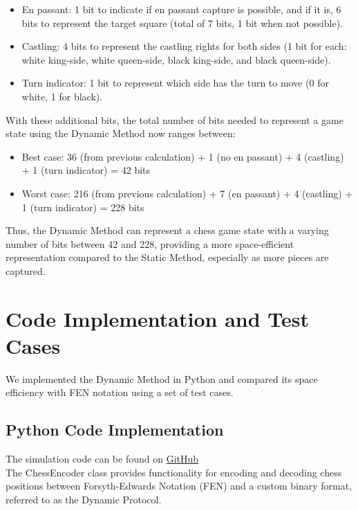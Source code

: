 \documentclass{article}
\begin{document}
\begin{itemize}  
    \item En passant: 1 bit to indicate if en passant capture is possible, and if it is, 6 bits to represent the target square (total of 7 bits, 1 bit when not possible).  
    \item Castling: 4 bits to represent the castling rights for both sides (1 bit for each: white king-side, white queen-side, black king-side, and black queen-side).  
    \item Turn indicator: 1 bit to represent which side has the turn to move (0 for white, 1 for black).  
\end{itemize}  
   
With these additional bits, the total number of bits needed to represent a game state using the Dynamic Method now ranges between:  
   
\begin{itemize}  
    \item Best case: 36 (from previous calculation) + 1 (no en passant) + 4 (castling) + 1 (turn indicator) = 42 bits  
    \item Worst case: 216 (from previous calculation) + 7 (en passant) + 4 (castling) + 1 (turn indicator) = 228 bits  
\end{itemize}  
   
Thus, the Dynamic Method can represent a chess game state with a varying number of bits between 42 and 228, providing a more space-efficient representation compared to the Static Method, especially as more pieces are captured.

\newpage
\section{Code Implementation and Test Cases}
   
We implemented the Dynamic Method in Python and compared its space efficiency with FEN notation using a set of test cases.
   
\subsection{Python Code Implementation}

The simulation code can be found on \href{https://github.com/knhash/EfficientChessBoardRepresentation/blob/main/simulation.ipynb}{GitHub}  \\

The ChessEncoder class provides functionality for encoding and decoding chess positions between Forsyth-Edwards Notation (FEN) and a custom binary format, referred to as the Dynamic Protocol.  \\
\end{document}
